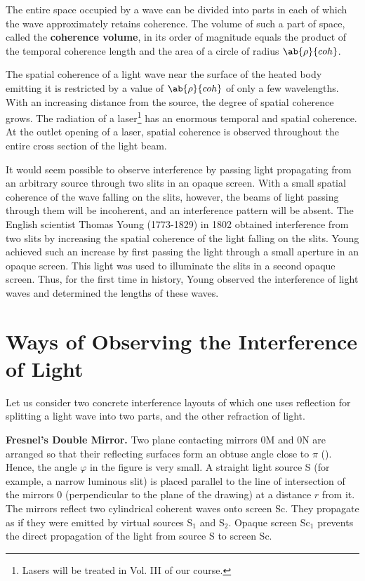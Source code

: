 The entire space occupied by a wave can be divided into parts in each of which the wave approximately retains coherence.
The volume of such a part of space, called the \textbf{coherence volume}, in its order of
magnitude equals the product of the temporal coherence length and the area of a circle of radius $\ab{\rho}{coh}$.

The spatial coherence of a light wave near the surface of the heated body emitting it is restricted by a value of $\ab{\rho}{coh}$ of only a few wavelengths.
With an increasing distance from the source, the degree of spatial coherence grows.
The radiation of a laser\footnote{Lasers will be treated in Vol. III of our course.} has an enormous temporal and spatial coherence.
At the outlet opening of a laser, spatial coherence is observed throughout the entire cross section of the light beam.

It would seem possible to observe interference by passing light propagating from an arbitrary source through two slits in an opaque screen.
With a small spatial coherence of the wave falling on the slits, however, the beams of light passing through them will be incoherent, and an interference pattern will be absent.
The English scientist Thomas Young (1773-1829) in 1802 obtained interference from two slits by increasing the spatial coherence of the light falling on the slits.
Young achieved such an increase by first passing the light through a small aperture in an opaque screen.
This light was used to illuminate the slits in a second opaque screen.
Thus, for the first time in history, Young observed the interference of light waves and determined the lengths of these waves.

\section{Ways of Observing the Interference of Light}\label{sec:17_3}

Let us consider two concrete interference layouts of which one uses reflection for splitting a light wave into two parts, and the other refraction of light.

\textbf{Fresnel's Double Mirror.}
Two plane contacting mirrors $0$M and $0$N are arranged so that their reflecting surfaces form an obtuse angle close to $\pi$ ().
Hence, the angle $\varphi$ in the figure is very small.
A straight light source S (for example, a narrow luminous slit) is placed parallel to the line of intersection of the mirrors $0$ (perpendicular
to the plane of the drawing) at a distance $r$ from it.
The mirrors reflect two cylindrical coherent waves onto screen Sc.
They propagate as if they were emitted by virtual sources S$_1$ and S$_2$.
Opaque screen Sc$_1$ prevents the direct propagation of the light from source S to screen Sc.

